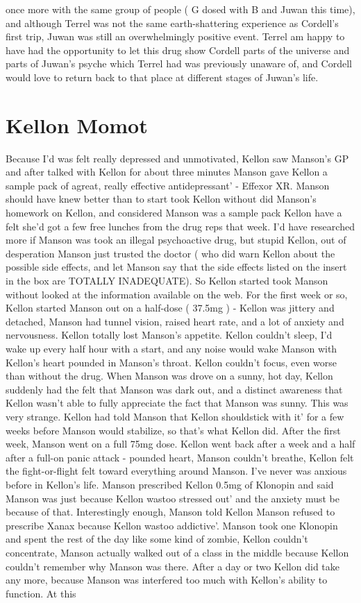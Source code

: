 \documentclass[12pt]{book}
\begin{document}
once more with the same group of people ( G dosed with B and Juwan this time), and although Terrel was not the same earth-shattering experience as Cordell's first trip, Juwan was still an overwhelmingly positive event. Terrel am happy to have had the opportunity to let this drug show Cordell parts of the universe and parts of Juwan's psyche which Terrel had was previously unaware of, and Cordell would love to return back to that place at different stages of Juwan's life.



\chapter{Kellon Momot}

Because I'd was felt really depressed and unmotivated, Kellon saw Manson's GP and after talked with Kellon for about three minutes Manson gave Kellon a sample pack of agreat, really effective antidepressant' - Effexor XR. Manson should have knew better than to start took Kellon without did Manson's homework on Kellon, and considered Manson was a sample pack Kellon have a felt she'd got a few free lunches from the drug reps that week. I'd have researched more if Manson was took an illegal psychoactive drug, but stupid Kellon, out of desperation Manson just trusted the doctor ( who did warn Kellon about the possible side effects, and let Manson say that the side effects listed on the insert in the box are TOTALLY INADEQUATE). So Kellon started took Manson without looked at the information available on the web. For the first week or so, Kellon started Manson out on a half-dose ( 37.5mg ) - Kellon was jittery and detached, Manson had tunnel vision, raised heart rate, and a lot of anxiety and nervousness. Kellon totally lost Manson's appetite. Kellon couldn't sleep, I'd wake up every half hour with a start, and any noise would wake Manson with Kellon's heart pounded in Manson's throat. Kellon couldn't focus, even worse than without the drug. When Manson was drove on a sunny, hot day, Kellon suddenly had the felt that Manson was dark out, and a distinct awareness that Kellon wasn't able to fully appreciate the fact that Manson was sunny. This was very strange. Kellon had told Manson that Kellon shouldstick with it' for a few weeks before Manson would stabilize, so that's what Kellon did. After the first week, Manson went on a full 75mg dose. Kellon went back after a week and a half after a full-on panic attack - pounded heart, Manson couldn't breathe, Kellon felt the fight-or-flight felt toward everything around Manson. I've never was anxious before in Kellon's life. Manson prescribed Kellon 0.5mg of Klonopin and said Manson was just because Kellon wastoo stressed out' and the anxiety must be because of that. Interestingly enough, Manson told Kellon Manson refused to prescribe Xanax because Kellon wastoo addictive'. Manson took one Klonopin and spent the rest of the day like some kind of zombie, Kellon couldn't concentrate, Manson actually walked out of a class in the middle because Kellon couldn't remember why Manson was there. After a day or two Kellon did take any more, because Manson was interfered too much with Kellon's ability to function. At this 
\end{document}
